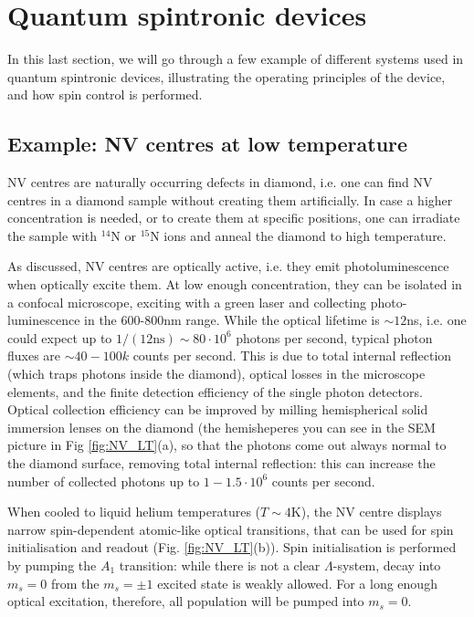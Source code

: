 \documentclass[a4paper,11pt]{article}
\begin{document}
\section{Quantum spintronic devices}
In this last section, we will go through a few example of different systems used in quantum spintronic devices, illustrating the operating principles of the device, and how spin control is performed.
\subsection {Example: NV centres at low temperature}
NV centres are naturally occurring defects in diamond, i.e. one can find NV centres in a diamond sample without creating them artificially. In case a higher concentration is needed, or to create them at specific positions, one can irradiate the sample with $^{14}$N or $^{15}$N ions and anneal the diamond to high temperature.

As discussed, NV centres are optically active, i.e. they emit photoluminescence when optically excite them. At low enough concentration, they can be isolated in a confocal microscope, exciting with a green laser and collecting photo-luminescence in the 600-800nm range. While the optical lifetime is $\sim 12$ns, i.e. one could expect up to $1/(12 \mbox{ns}) \sim 80 \cdot 10^6$ photons per second, typical photon fluxes are $\sim 40-100k$ counts per second. This is due to total internal reflection (which traps photons inside the diamond), optical losses in the microscope elements, and the finite detection efficiency of the single photon detectors. Optical collection efficiency can be improved by milling hemispherical solid immersion lenses on the diamond (the hemisheperes you can see in the SEM picture in Fig \ref{fig:NV_LT}(a), so that the photons come out always normal to the diamond surface, removing total internal reflection: this can increase the number of collected photons up to $1-1.5 \cdot 10^6$ counts per second.

When cooled to liquid helium temperatures ($T \sim 4$K), the NV centre displays narrow spin-dependent atomic-like optical transitions, that can be used for spin initialisation and readout (Fig. \ref{fig:NV_LT}(b)). Spin initialisation is performed by pumping the $A_1$ transition: while there is not a clear $\Lambda$-system, decay into $m_s = 0$ from the $m_s = \pm 1$ excited state is weakly allowed. For a long enough optical excitation, therefore, all population will be pumped into $m_s = 0$.
\end{document}
